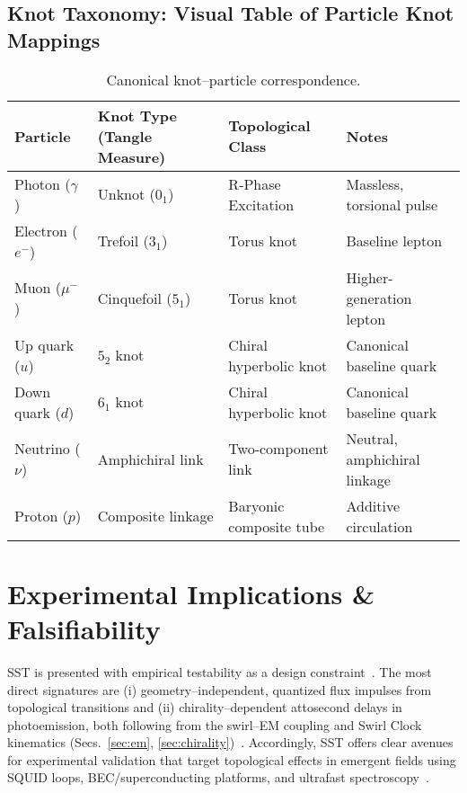 \documentclass[10pt,reprint,aps,onecolumn,nofootinbib]{revtex4-2}
\begin{document}
\subsection*{Knot Taxonomy: Visual Table of Particle Knot Mappings}
    \begin{table}[h!]\centering\small
    \begin{adjustbox}{max width=\textwidth}
    \begin{tabular}{|l|l|l|l|}
    \hline
    \textbf{Particle} & \textbf{Knot Type (Tangle Measure)} & \textbf{Topological Class} & \textbf{Notes} \\
    \hline
    Photon ($\gamma$) & Unknot ($0_1$) & R-Phase Excitation & Massless, torsional pulse~\cite{1, 4} \\
    Electron ($e^-$) & Trefoil ($3_1$) & Torus knot & Baseline lepton~\cite{1, 4} \\
    Muon ($\mu^-$) & Cinquefoil ($5_1$) & Torus knot & Higher-generation lepton~\cite{4} \\
    Up quark ($u$) & $5_2$ knot & Chiral hyperbolic knot & Canonical baseline quark~\cite{1, 4} \\
    Down quark ($d$) & $6_1$ knot & Chiral hyperbolic knot & Canonical baseline quark~\cite{1, 4} \\
    Neutrino ($\nu$) & Amphichiral link & Two-component link & Neutral, amphichiral linkage~\cite{4} \\
    Proton ($p$) & Composite linkage & Baryonic composite tube & Additive circulation~\cite{3} \\
    \hline
    \end{tabular}
    \end{adjustbox}
    \caption{Canonical knot–particle correspondence.}
    \label{tab:knotetable}
    \end{table}

\section{Experimental Implications \& Falsifiability}
\label{sec:falsifiability}
SST is presented with empirical testability as a design constraint~\cite{20}. The most direct signatures are (i) geometry–independent, quantized flux impulses from topological transitions and (ii) chirality–dependent attosecond delays in photoemission, both following from the swirl–EM coupling and Swirl Clock kinematics (Secs.~\ref{sec:em}, \ref{sec:chirality})~\cite{2}. Accordingly, SST offers clear avenues for experimental validation that target topological effects in emergent fields using SQUID loops, BEC/superconducting platforms, and ultrafast spectroscopy~\cite{2}.
\end{document}
